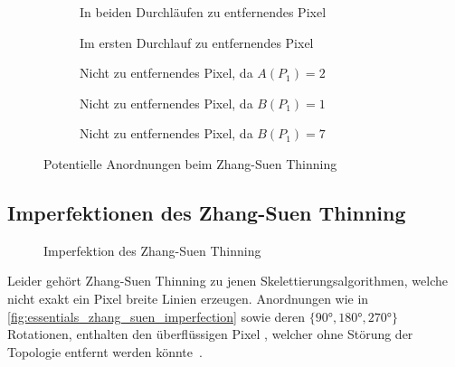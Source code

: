 \clearpage
\begin{figure}[!htb]
    \centering
    \begin{subfigure}[t]{0.3\textwidth}
        \centering
        
        \caption{In beiden Durchläufen zu entfernendes Pixel}%
        \label{fig:essentials_zhang_suen_cond_both}
    \end{subfigure}
    \hfill
    \begin{subfigure}[t]{0.3\textwidth}
        \centering
        
        \caption{Im ersten Durchlauf zu entfernendes Pixel}%
        \label{fig:essentials_zhang_suen_cond_1}
    \end{subfigure}
    \hfill
    \begin{subfigure}[t]{0.3\textwidth}
        \centering
        
        \caption{Nicht zu entfernendes Pixel, da \(A(P_1) = 2\)}%
        \label{fig:essentials_zhang_suen_cond_a}
    \end{subfigure}

    \begin{subfigure}[t]{0.3\textwidth}
        \centering
        
        \caption{Nicht zu entfernendes Pixel, da \(B(P_1) = 1\)}%
        \label{fig:essentials_zhang_suen_cond_b1}
    \end{subfigure}
    \qquad
    \begin{subfigure}[t]{0.3\textwidth}
        \centering
        
        \caption{Nicht zu entfernendes Pixel, da \(B(P_1) = 7\)}%
        \label{fig:essentials_zhang_suen_cond_b7}
    \end{subfigure}
    \caption{Potentielle Anordnungen beim Zhang-Suen Thinning}
\end{figure}

\subsection{Imperfektionen des Zhang-Suen Thinning}%
\label{subsec:essentials_skeletonization_zhang_suen_imperfection}

\begin{figure}
    \centering
    
    \caption{Imperfektion des Zhang-Suen Thinning}%
    \label{fig:essentials_zhang_suen_imperfection}
\end{figure}
Leider gehört Zhang-Suen Thinning zu jenen Skelettierungsalgorithmen, welche nicht exakt ein Pixel breite Linien erzeugen.
Anordnungen wie in \autoref{fig:essentials_zhang_suen_imperfection} sowie deren \(\lbrace{}90°,180°,270°\rbrace{}\) Rotationen, enthalten den überflüssigen Pixel , welcher ohne Störung der Topologie entfernt werden könnte~\cite{DBLP:journals/pami/LamLS92}.

